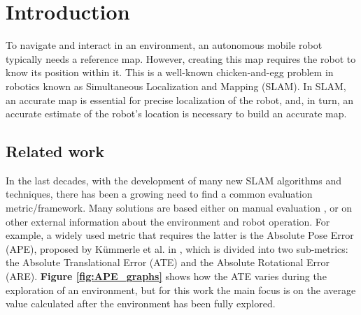 
\section{Introduction} %
To navigate and interact in an environment, an autonomous mobile robot typically needs a reference map. However, creating this map requires the robot to know its position within it. This is a well-known chicken-and-egg problem in robotics known as Simultaneous Localization and Mapping (SLAM). In SLAM, an accurate map is essential for precise localization of the robot, and, in turn, an accurate estimate of the robot's location is necessary to build an accurate map.


\subsection{Related work}\label{sec:related} %
In the last decades, with the development of many new SLAM algorithms and techniques, there has been a growing need to find a common evaluation metric/framework. Many solutions are based either on manual evaluation \cite{balaguer2007visualEval}, or on other external information about the environment and robot operation. For example, a widely used metric that requires the latter is the Absolute Pose Error (APE), proposed by Kümmerle et al. in \cite{kummerle2009ATE}, which is divided into two sub-metrics: the Absolute Translational Error (ATE) and the Absolute Rotational Error (ARE). \textbf{Figure \ref{fig:APE_graphs}} shows how the ATE varies during the exploration of an environment, but for this work the main focus is on the average value calculated after the environment has been fully explored.

